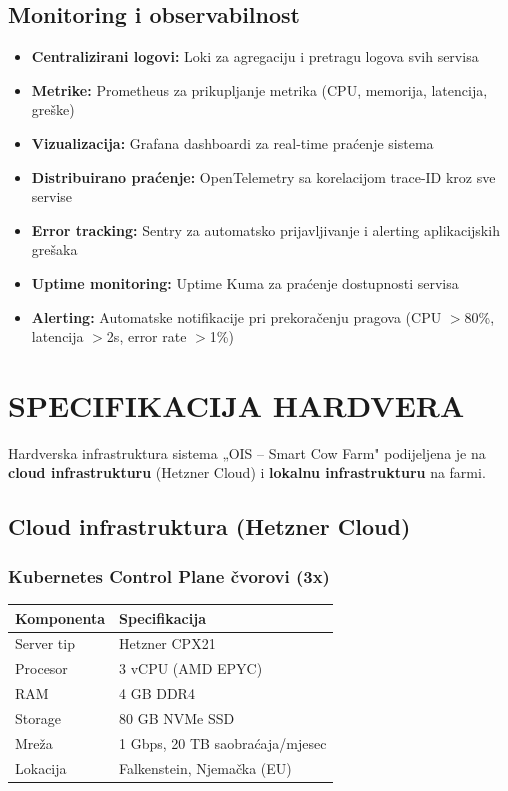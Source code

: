 \documentclass{article}
\begin{document}
\subsection{Monitoring i observabilnost}

\begin{itemize}
    \item \textbf{Centralizirani logovi:} Loki za agregaciju i pretragu logova svih servisa
    \item \textbf{Metrike:} Prometheus za prikupljanje metrika (CPU, memorija, latencija, greške)
    \item \textbf{Vizualizacija:} Grafana dashboardi za real-time praćenje sistema
    \item \textbf{Distribuirano praćenje:} OpenTelemetry sa korelacijom trace-ID kroz sve servise
    \item \textbf{Error tracking:} Sentry za automatsko prijavljivanje i alerting aplikacijskih grešaka
    \item \textbf{Uptime monitoring:} Uptime Kuma za praćenje dostupnosti servisa
    \item \textbf{Alerting:} Automatske notifikacije pri prekoračenju pragova (CPU $>$80\%, latencija $>$2s, error rate $>$1\%)
\end{itemize}

\newpage
\section{SPECIFIKACIJA HARDVERA}

Hardverska infrastruktura sistema „OIS -- Smart Cow Farm" podijeljena je na \textbf{cloud infrastrukturu} (Hetzner Cloud) i \textbf{lokalnu infrastrukturu} na farmi.

\subsection{Cloud infrastruktura (Hetzner Cloud)}

\subsubsection{Kubernetes Control Plane čvorovi (3x)}

\begin{center}
\begin{tabular}{|l|l|}
\hline
\rowcolor{lightgray}
\textbf{Komponenta} & \textbf{Specifikacija} \\
\hline
Server tip & Hetzner CPX21 \\
\hline
Procesor & 3 vCPU (AMD EPYC) \\
\hline
RAM & 4 GB DDR4 \\
\hline
Storage & 80 GB NVMe SSD \\
\hline
Mreža & 1 Gbps, 20 TB saobraćaja/mjesec \\
\hline
Lokacija & Falkenstein, Njemačka (EU) \\
\hline
\end{tabular}
\end{center}
\end{document}
